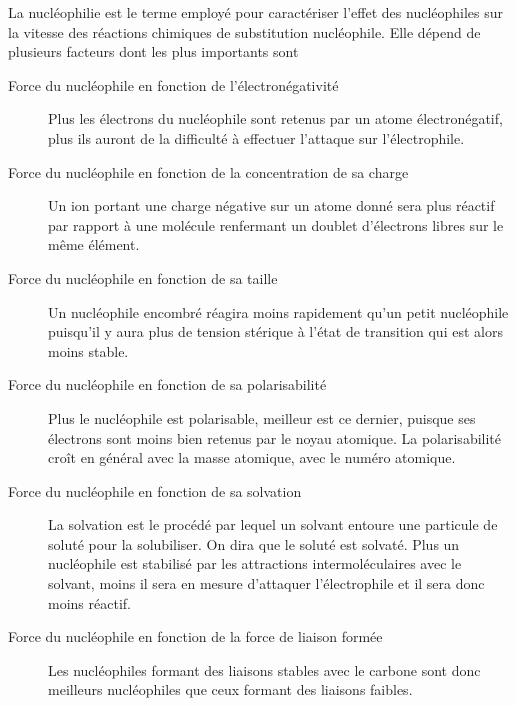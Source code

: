 La nucléophilie est le terme employé pour caractériser l'effet des nucléophiles sur la vitesse des réactions chimiques de substitution nucléophile.
Elle dépend de plusieurs facteurs dont les plus importants sont
\begin{description}
  \item[Force du nucléophile en fonction de l'électronégativité]

    Plus les électrons du nucléophile sont retenus par un atome électronégatif, plus ils auront de la difficulté à effectuer l'attaque sur l'électrophile.
  \item[Force du nucléophile en fonction de la concentration de sa charge]

    Un ion portant une charge négative sur un atome donné sera plus réactif par rapport à une molécule renfermant un doublet d'électrons libres sur le même élément.

  \item[Force du nucléophile en fonction de sa taille]

    Un nucléophile encombré réagira moins rapidement qu'un petit nucléophile puisqu'il y aura plus de tension stérique à l'état de transition qui est alors moins stable.

  \item[Force du nucléophile en fonction de sa polarisabilité]

    Plus le nucléophile est polarisable, meilleur est ce dernier, puisque ses électrons  sont moins bien retenus par le noyau atomique.
    La polarisabilité croît en général avec la masse atomique, avec le numéro atomique.

  \item[Force du nucléophile en fonction de sa solvation]

    La solvation est le procédé par lequel un solvant entoure une particule de soluté pour la solubiliser.
    On dira que le soluté est solvaté.
    Plus un nucléophile est stabilisé par les attractions intermoléculaires avec le solvant, moins il sera en mesure d'attaquer l'électrophile et il sera donc moins réactif.

  \item[Force du nucléophile en fonction de la force de liaison formée]

    Les nucléophiles formant des liaisons stables avec le carbone sont donc meilleurs nucléophiles que ceux formant des liaisons faibles.

\end{description}


